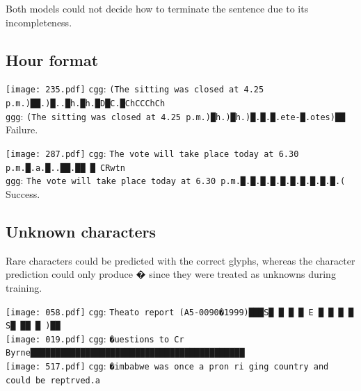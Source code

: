 \documentclass[11pt,twocolumn]{article}
\begin{document}
\vspace{-0.8em}
Both models could not decide how to terminate the sentence due to its incompleteness.

\subsection{Hour format}\label{sec:hour-format}

\vspace{1.2em}\noindent\texttt{[image: 235.pdf]}
\texttt{cgg}: \texttt{(The sitting was closed at 4.25 p.m.)██.)█..█h.█h.█D█C.█ChCCChCh}\\
\texttt{ggg}: \texttt{(The sitting was closed at 4.25 p.m.)█h.)█h.)█.█.█.ete-█.otes)██}\\

\vspace{-0.8em}
Failure.

\vspace{1.2em}\noindent\texttt{[image: 287.pdf]}
\texttt{cgg}: \texttt{The vote will take place today at 6.30 p.m.█.a.█..██.██  █ CRwtn}\\
\texttt{ggg}: \texttt{The vote will take place today at 6.30 p.m.█.█.█.█.█.█.█.█.█.█.(}\\

\vspace{-0.8em}
Success.

\subsection{Unknown characters}\label{sec:unkn-char}

Rare characters could be predicted with the correct glyphs,
whereas the character prediction could only produce � since they were treated as unknowns during training.

\vspace{1.2em}\noindent\texttt{[image: 058.pdf]}
\texttt{cgg}: \texttt{Theato report (A5-0090�1999)███S█ █  █ █ E █ █ █  █ S█ ██ █ )██}\\

\vspace{1.2em}\noindent\texttt{[image: 019.pdf]}
\texttt{cgg}: \texttt{�uestions to Cr Byrne███████████████████████████████████████████}\\

\vspace{1.2em}\noindent\texttt{[image: 517.pdf]}
\texttt{cgg}: \texttt{�imbabwe was once a pron ri ging country and could be reptrved.a}\\
\end{document}
